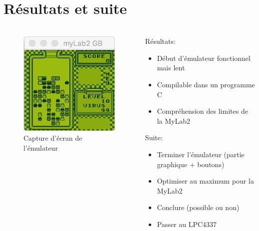 \documentclass{beamer}
\begin{document}
\section{Résultats et suite}
\begin{frame}
	\frametitle{\secname}
  \begin{columns}[T]
		\begin{column}{.40\textwidth}
			\begin{figure}
				\includegraphics[width=.75\textwidth]{images/screenshot.png}
				\caption{Capture d'écran de l'émulateur}
			\end{figure}
		\end{column}
		\begin{column}{.70\textwidth}
      Résultats:
      \begin{itemize}
        \item Début d'émulateur fonctionnel mais lent
        \item Compilable dans un programme C
        \item Compréhension des limites de la MyLab2
      \end{itemize}
      Suite:
      \begin{itemize}
        \item Terminer l'émulateur (partie graphique + boutons)
        \item Optimiser au maximum pour la MyLab2
        \item Conclure (possible ou non)
        \item Passer au LPC4337
      \end{itemize}
		\end{column}
	\end{columns}
\end{frame}
\end{document}
